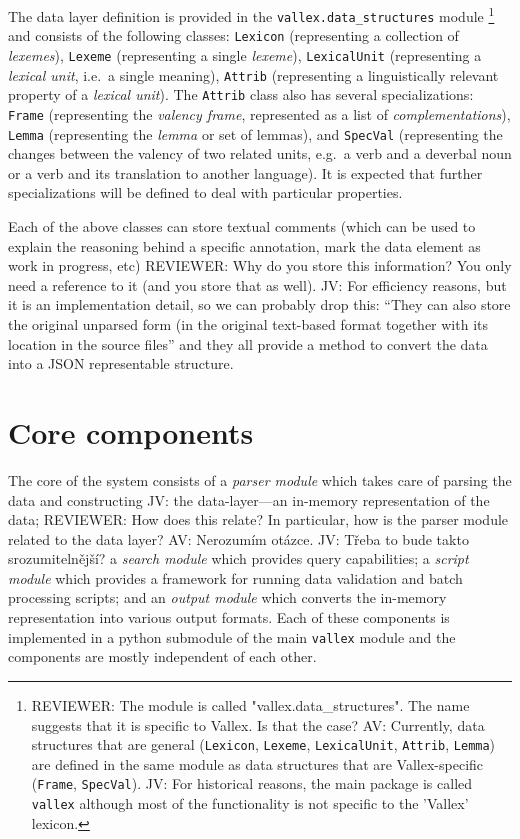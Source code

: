 \documentclass[10pt, a4paper]{article}
\newcommand{\py}[1]{{\tt #1}}
\newcommand{\av}[1]{{\color{ansa} AV: #1}}
\newcommand{\jv}[1]{{\color{svlinks} JV: #1}}
\newcommand{\rrr}[1]{{\color{red} REVIEWER: #1}}
\begin{document}
The data layer definition is provided in the \py{vallex.data\_structures} module%
\footnote{%
\rrr{The module is called "vallex.data\_structures". The name suggests that it is specific to Vallex. Is that the case?
}
\av{Currently, data structures that are general
(\py{Lexicon}, \py{Lexeme}, \py{LexicalUnit}, \py{Attrib}, \py{Lemma})
are defined in the same module as data structures that are Vallex-specific
(\py{Frame}, \py{SpecVal}).
}
\jv{For historical reasons, the main package is called \py{vallex} although most of the functionality
is not specific to the 'Vallex' lexicon.}
}
and consists of the
following classes:
\py{Lexicon} (representing a collection of \emph{lexemes}), \py{Lexeme} (representing
a single \emph{lexeme}), \py{LexicalUnit} (representing a \emph{lexical unit}, i.e.\ a single meaning), \py{Attrib} (representing a linguistically relevant property of a \emph{lexical unit}). The \py{Attrib} class also has several specializations:
\py{Frame} (representing the \emph{valency frame}, represented as a list of \emph{complementations}),
\py{Lemma} (representing the \emph{lemma} or set of lemmas), and
\py{SpecVal} (representing the changes between the valency of two related units,
e.g.\ a verb and a deverbal noun or a verb and its translation to another language).
It is expected that further specializations
will be defined to deal with particular properties.

Each of the above classes can store textual comments (which can be used to explain
the reasoning behind a specific annotation, mark the data element as work in progress, etc)
\rrr{Why do you store this information? You only need a reference to it (and you store that as well).}
\jv{For efficiency reasons, but it is an implementation detail, so we can probably drop this: ``They can also
store the original unparsed form (in the original text-based format
together with its location in the source files''}
and they all provide a method to convert the data into a JSON representable structure.

\section{Core components}
The core of the system consists of a \emph{parser module} which takes care of parsing the data and
constructing \jv{the data-layer---an in-memory representation of the data};
\rrr{How does this relate? In particular, how is the parser module related to the data layer?}
\av{Nerozumím otázce.}
\jv{Třeba to bude takto srozumitelnější?}
a \emph{search module} which
provides query capabilities; a \emph{script module} which provides a framework for running data validation
and batch processing scripts; and an \emph{output module} which converts the in-memory representation into
various output formats. Each of these components is implemented in a python submodule of the main \py{vallex}
module and the components are mostly independent of each other.
\end{document}
